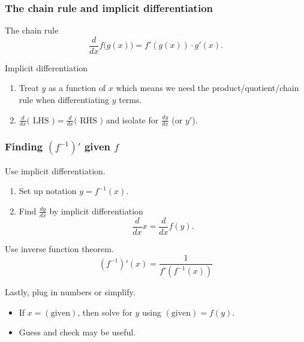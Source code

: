 \documentclass[aspectratio=169, 12pt]{beamer}
\begin{document}
\begin{frame}[t]
  \frametitle{The chain rule and implicit differentiation}
  
  The chain rule
  \[ 
  \frac{d}{dx} f\big(g(x)\big) = f'(g(x)) \cdot g'(x).
  \]
  
  \bigskip
  Implicit differentiation
  \begin{enumerate}[itemsep=2ex]
    \item Treat \(y\) as a function of \(x\) which means we need the product/quotient/chain rule when differentiating \(y\) terms.
    \item \(\frac{d}{dx} \big( \text{ LHS } \big) = \frac{d}{dx} \big( \text{ RHS } \big)\) and isolate for \(\frac{dy}{dx}\) (or \(y'\)).
  \end{enumerate}
\end{frame}

\begin{frame}
  \frametitle{Finding \((f^{-1})'\) given \(f\)}
  
  \begin{minipage}[t]{0.55\textwidth}
    Use implicit differentiation.
    \begin{enumerate}[itemsep=1ex]
      \item Set up notation \(y = f^{-1}(x)\).
      \item Find \(\frac{dy}{dx}\) by implicit differentiation \[\frac{d}{dx} x = \frac{d}{dx} f(y).\]
    \end{enumerate}
  \end{minipage}
  \hfill
  \begin{minipage}[t]{0.40\textwidth}
    Use inverse function theorem.
    \[
      \left(f^{-1}\right)'(x) = \frac{1}{f'(f^{-1}(x))}
    \]
  \end{minipage}
  
  \bigskip
  Lastly, plug in numbers or simplify. 
  \begin{itemize}
    \item If \(x = (\text{given})\), then solve for \(y\) using \((\text{given}) = f(y)\). 
    \item Guess and check may be useful.
  \end{itemize}
\end{frame}
\end{document}
